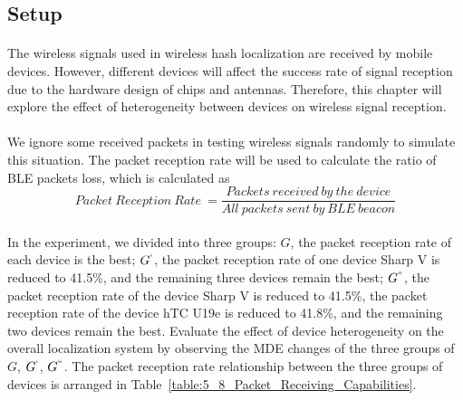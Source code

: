 \documentclass[a4paper,12pt]{report}
\begin{document}
\subsection{Setup}

\paragraph{}
The wireless signals used in wireless hash localization are received by mobile devices. However, different devices will affect the success rate of signal reception due to the hardware design of chips and antennas. Therefore, this chapter will explore the effect of heterogeneity between devices on wireless signal reception.

\paragraph{}
We ignore some received packets in testing wireless signals randomly to simulate this situation. The packet reception rate will be used to calculate the ratio of BLE packets loss, which is calculated as
\begin{equation}
\label{equation:Packet_Reception_Rate}
Packet\ Reception\ Rate\ = \frac{Packets\ received\ by\ the\ device}{All\ packets\ sent\ by\ BLE\ beacon}
\end{equation}

\paragraph{}
In the experiment, we divided into three groups: $G$, the packet reception rate of each device is the best; $G^`$, the packet reception rate of one device Sharp V is reduced to 41.5\%, and the remaining three devices remain the best; $G^{``}$, the packet reception rate of the device Sharp V is reduced to 41.5\%, the packet reception rate of the device hTC U19e is reduced to 41.8\%, and the remaining two devices remain the best. Evaluate the effect of device heterogeneity on the overall localization system by observing the MDE changes of the three groups of $G$, $G^`$, $G^{``}$. The packet reception rate relationship between the three groups of devices is arranged in Table~\ref{table:5_8_Packet_Receiving_Capabilities}.
\end{document}
